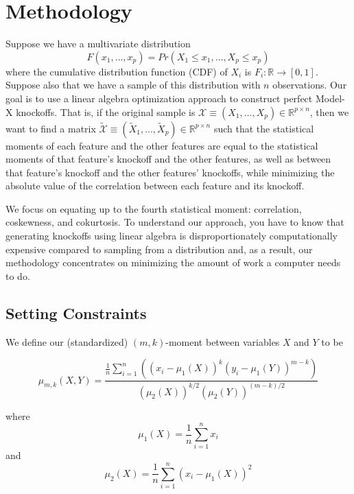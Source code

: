 \documentclass[review]{elsarticle}
\begin{document}
\section{Methodology}

Suppose we have a multivariate distribution $$F(x_1,\dots,x_p)=Pr(X_1\le x_1,\dots,X_p\le x_p)$$ where the cumulative distribution function (CDF) of $X_i$ is $F_i:\mathbb{R}\rightarrow [0,1]$. Suppose also that we have a sample of this distribution with $n$ observations. Our goal is to use a linear algebra optimization approach to construct perfect Model-X knockoffs. That is, if the original sample is $\mathcal{X}\equiv(X_1,\dots,X_p)\in \mathbb{R}^{p\times n}$, then we want to find a matrix $\tilde{\mathcal{X}}\equiv(\tilde{X}_1,\dots,\tilde{X}_p)\in \mathbb{R}^{p\times n}$ such that the statistical moments of each feature and the other features are equal to the statistical moments of that feature's knockoff and the other features, as well as between that feature's knockoff and the other features' knockoffs, while minimizing the absolute value of the correlation between each feature and its knockoff.

We focus on equating up to the fourth statistical moment: correlation, coskewness, and cokurtosis. To understand our approach, you have to know that generating knockoffs using linear algebra is disproportionately computationally expensive compared to sampling from a distribution and, as a result, our methodology concentrates on minimizing the amount of work a computer needs to do.

\subsection{Setting Constraints}

We define our (standardized) $(m,k)$-moment between variables $X$ and $Y$ to be 

$$\mu_{m,k}(X,Y) = \frac{\frac{1}{n}\sum_{i=1}^{n}\left((x_i-\mu_{1}(X))^k (y_i-\mu_{1}(Y))^{m-k}\right)}{(\mu_{2}(X))^{k/2}(\mu_{2}(Y))^{(m-k)/2}}$$

where $$\mu_{1}(X)=\frac{1}{n}\sum_{i=1}^n x_i$$ and $$\mu_{2}(X)=\frac{1}{n}\sum_{i=1}^n (x_i-\mu_{1}(X))^2$$

\end{document}
